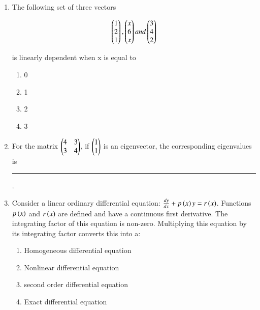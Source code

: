 \documentclass[journal,12pt,onecolumn]{IEEEtran}
\theoremstyle{remark}
\begin{document}
\begin{enumerate}
    \item The following set of three vectors

    \begin{align*}
        \begin{pmatrix}
        1 \\
        2 \\
        1 \\
        \end{pmatrix},
        \begin{pmatrix}
        x \\
        6 \\
        x \\
        \end{pmatrix} and 
        \begin{pmatrix}
        3 \\
        4 \\
        2 \\
        \end{pmatrix}
    \end{align*}

is linearly dependent when x is equal to 

\hfill{}
\begin{enumerate}
    \item 0
     \item 1
      \item 2
       \item 3
\end{enumerate}

    \item For the matrix $\begin{pmatrix}
    4 & 3 \\
    3 & 4 \\
    \end{pmatrix}$, if $\begin{pmatrix}
    1 \\
    1 \\
    \end{pmatrix}$ is an eigenvector, the corresponding eigenvalues is \rule{40pt}{0.1mm}.

\hfill{}
    \item Consider a linear ordinary differential equation: $\frac{dy}{dx} + p\left(x\right)y = r\left(x\right)$. Functions $p\left(x\right)$ and $r\left(x\right)$ are defined and have a continuous first derivative. The integrating factor of this equation is non-zero. Multiplying this equation by its integrating factor converts this into a:

\hfill{}
\begin{multicols}{2}
\begin{enumerate}
    \item Homogeneous differential equation
     \item Non\-linear differential equation
      \item second order differential equation
       \item Exact differential equation
\end{enumerate}
\end{multicols}


\end{enumerate}
\end{document}
